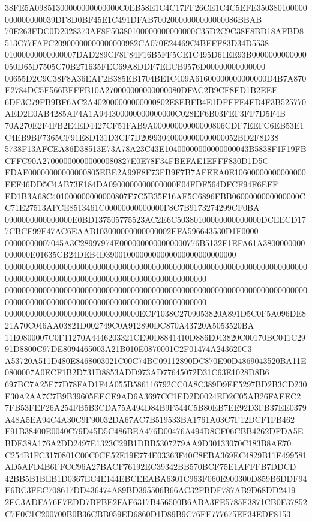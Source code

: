 \documentclass[UTF8,fontset=fandol,zihao=-4,a4paper]{ctexart}
\begin{document}
{{38FE5A09851300000000000000C0EB58E1C4C17FF26CE1C4C5EFE350380100000000000000039DF8D0BF45E1C491DFAB70020000000000000086BBAB
70E263FDC0D2028373AF8F50380100000000000000C35D2C9C38F8BD18AFBD8513C77FAFC20900000000000000982CA070E24469C4BFFF83D34D5538
01000000000000007DAD289CF8F84F16B5FF5CE1C495D61EE93B0000000000000050D65D7505C70B271635FEC69A8DDF7EECB9576D00000000000000
00655D2C9C38F8A36EAF2B385EB1704BE1C409A61600000000000000D4B7A870E2784DC5F566BFFFB10A270000000000000080DFAC2B9CF8ED1B2EEE
6DF3C79FB9BF6AC2A402000000000000802E8EBFB4E1DFFFE4FD4F3B525770AED2E0AB4285AF4A1A944300000000000000C028EF6B03FEF3FF7D5F4B
70A270E2F4FB2E4ED4427CF51FAB9A00000000000000806CDF7EEFC6EB53E1C4EB9BF7365CF91E8D131D3CF7D20993040000000000000052BD2F8D38
5738F13AFCEA86D38513E73A78A23C43E10400000000000000043B5838F1F19FBCFFC90A270000000000000080827E0E78F34FBEFAE1EFFF830D1D5C
FDAF00000000000000805EBE2A99F8F73FB9F7B7AFEEA0E10600000000000000FEF46DD5C4AB73E184DA0900000000000000E04FDF564DFCF94F6EFF
ED1B3A68C401000000000000807F7C5B35F16AF5C6896FBB0600000000000000CC71E27513AFCE8513461C00000000000000F8C7B9173274299CF0BA
0900000000000000E0BD137505775523AC2E6C50380100000000000000DCEECD177CBCF99F47AC6EAAB103000000000000002EFA596643530D1F0000
00000000007045A3C28997974E0000000000000000776B5132F1EFA61A3800000000000000E01635CB24DEB4D3900100000000000000000000000000
000000000000000000000000000000000000000000000000000000000000000000000000000000000000000000000000000000000000000000000000
000000000000000000000000000000000000000000000000000000000000000000000000000000000000000000000000000000000000000000000000
00000000000000000000000000000000ECF1038C2709053820A891D5C0F5A096DE821A70C046AA03821D002749C0A912890DC870A43720A5053520BA
11E0800007C0F11270A4446203321CE90D8841410D886E043820C00170BC041C2991D8800C97DE8094465003A21B010E0870001C2F01474A243620C3
A53720A511D480E8468003021C00C74BC09112890DC870E90D4869043520BA11E0800007A0ECF1B2D731D8853ADD973AD77645072D31C63E1028D8B6
697BC7A25F77D78FAD1F4A055B586116792CC0A8C389D9EE5297BD2B3CD230F30A2AA7C7B9B39605EECE9AD6A3697CC1ED2D0024ED2C05AB26FAEEC2
7FB53FEF26A254FB5B3CDA75A494D84B9F544C5B80EB7EE92D3FB37EE0379A48A5EA94C4A30C9F90032DA67AC7B519533BA1761A03C7F12DCF1FB462
F91B38400E0040C79D45D5C486BEA476D00476A494D8CF06CBB4262DFDA5EBDE38A176A2DD2497E1323C29B1DBB5307279AA9D30133070C183B8AE70
C254B1FC3170801C00C0CE52E19E774E03363F40C8EBA369EC4829B11F499581AD5AFD4B6FFCC96A27BACF76192EC39342BB570BCF75E1AFFFB7DDCD
42BB5B1BEB1D0367EC4E144EBCEEABA6301C963F060E900300D859B6DDF94E6BC3FEC708617DD436474A89BD395506B66AC32FBDF787AB9D68DD2419
2EC3ADFA76E7EDD7BFBE2FAF6317B456500B6ABA3FE5785F3871CB0F37852C7F0C1C200700B0B36CBB059ED6860D1D89B9C76FF777675EF34EDF8153
}}
\end{document}
